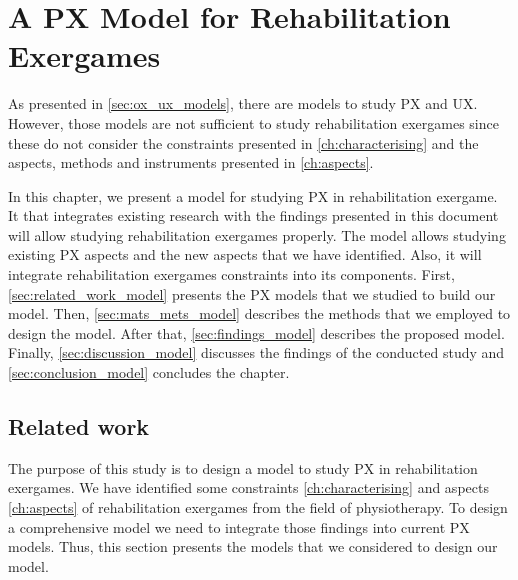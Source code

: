 \chapter{A PX Model for Rehabilitation Exergames}
\label{ch:model}
As presented in \autoref{sec:ox_ux_models}, there are models to study \ac{PX} and \ac{UX}. However, those models are not sufficient to study rehabilitation exergames since these do not consider the constraints presented in \autoref{ch:characterising} and the aspects, methods and instruments presented in \autoref{ch:aspects}.

In this chapter, we present a model for studying \ac{PX} in rehabilitation exergame. It that integrates existing research with the findings presented in this document will allow studying rehabilitation exergames properly. The model allows studying existing \ac{PX} aspects and the new aspects that we have identified. Also, it will integrate rehabilitation exergames constraints into its components. First, \autoref{sec:related_work_model} presents the \ac{PX} models that we studied to build our model. Then, \autoref{sec:mats_mets_model} describes the methods that we employed to design the model. After that, \autoref{sec:findings_model} describes the proposed model. Finally, \autoref{sec:discussion_model} discusses the findings of the conducted study and \autoref{sec:conclusion_model} concludes the chapter.

\section{Related work} %
\label{sec:related_work_model}
The purpose of this study is to design a model to study \ac{PX} in rehabilitation exergames. We have identified some constraints \autoref{ch:characterising} and aspects \autoref{ch:aspects} of rehabilitation exergames from the field of physiotherapy. To design a comprehensive model we need to integrate those findings into current \ac{PX} models. Thus, this section presents the models that we considered to design our model.

